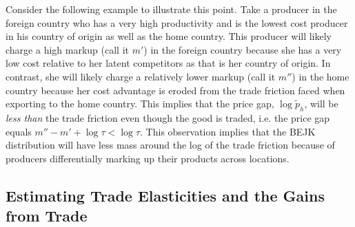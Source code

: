 \documentclass[12pt,dvips, ps2pdf]{article}
\begin{document}
Consider the following example to illustrate this point. Take a producer in the foreign country who has a very high productivity and is the lowest cost producer in his country of origin as well as the home country. This producer will likely charge a high markup (call it $m'$) in the foreign country because she has a very low cost relative to her latent competitors as that is her country of origin. In contrast, she will likely charge a relatively lower markup (call it $m''$) in the home country because her cost advantage is eroded from the trade friction faced when exporting to the home country. This implies that the price gap, $\log\tilde p_h$, will be \emph{less than} the trade friction even though the good is traded, i.e. the price gap equals $m'' - m' + \log \tau < \log \tau$. This observation implies that the BEJK distribution will have less mass around the log of the trade friction because of producers differentially marking up their products across locations.

\subsection{Estimating Trade Elasticities and the Gains from Trade}
\end{document}
